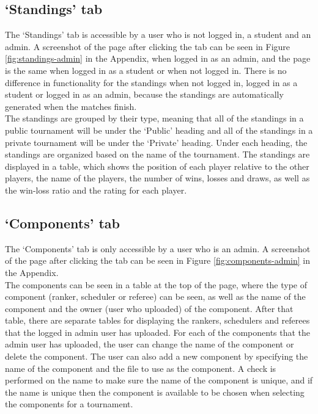 \documentclass[a4paper, 11pt]{report}
\begin{document}
\subsection{`Standings' tab}
\label{sec:impl-tab-standings}

The `Standings' tab is accessible by a user who is not logged in, a student
and an admin. A screenshot of the page after clicking the tab can be seen in
Figure \ref{fig:standings-admin} in the Appendix, when logged in as an admin,
and the page is the same when logged in as a student or when not logged in.
There is no difference in functionality for the standings when not logged in,
logged in as a student or logged in as an admin, because the standings are
automatically generated when the matches finish. \\

The standings are grouped by their type, meaning that all of the standings in a
public tournament will be under the `Public' heading and all of the standings in
a private tournament will be under the `Private' heading. Under each heading, the
standings are organized based on the name of the tournament. The standings are
displayed in a table, which shows the position of each player relative to the
other players, the name of the players, the number of wins, losses and draws, as
well as the win-loss ratio and the rating for each player.

\subsection{`Components' tab}
\label{sec:impl-tab-components}

The `Components' tab is only accessible by a user who is an admin. A screenshot
of the page after clicking the tab can be seen in Figure \ref{fig:components-admin}
in the Appendix. \\

The components can be seen in a table at the top of the page, where the type of
component (ranker, scheduler or referee) can be seen, as well as the name of the
component and the owner (user who uploaded) of the component. After that table,
there are separate tables for displaying the rankers, schedulers and referees
that the logged in admin user has uploaded. For each of the components that the
admin user has uploaded, the user can change the name of the component or delete
the component. The user can also add a new component by specifying the name of the
component and the file to use as the component. A check is performed on the name
to make sure the name of the component is unique, and if the name is unique then
the component is available to be chosen when selecting the components for a
tournament.
\end{document}
